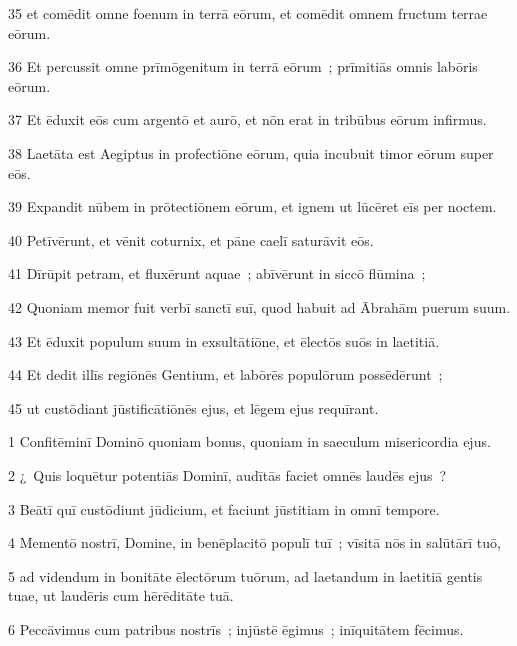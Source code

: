 \psalmVerse
  {\phantom{0}35}
  {et comēdit omne foenum in terrā eōrum, et comēdit omnem fructum terrae eōrum.}


\psalmVerse
  {\phantom{0}36}
  {Et percussit omne prīmōgenitum in terrā eōrum~; prīmitiās omnis labōris eōrum.}


\psalmVerse
  {\phantom{0}37}
  {Et ēduxit eōs cum argentō et aurō, et nōn erat in tribūbus eōrum infirmus.}


\psalmVerse
  {\phantom{0}38}
  {Laetāta est Aegiptus in profectiōne eōrum, quia incubuit timor eōrum super eōs.}


\psalmVerse
  {\phantom{0}39}
  {Expandit nūbem in prōtectiōnem eōrum, et ignem ut lūcēret eīs per noctem.}


\psalmVerse
  {\phantom{0}40}
  {Petīvērunt, et vēnit coturnix, et pāne caelī saturāvit eōs.}


\psalmVerse
  {\phantom{0}41}
  {Dīrūpit petram, et fluxērunt aquae~; abīvērunt in siccō flūmina~;}


\psalmVerse
  {\phantom{0}42}
  {Quoniam memor fuit verbī sanctī suī, quod habuit ad Ābrahām puerum suum.}


\psalmVerse
  {\phantom{0}43}
  {Et ēduxit populum suum in exsultātiōne, et ēlectōs suōs in laetitiā.}


\psalmVerse
  {\phantom{0}44}
  {Et dedit illīs regiōnēs Gentium, et labōrēs populōrum possēdērunt~;}


\psalmVerse
  {\phantom{0}45}
  {ut custōdiant jūstificātiōnēs ejus, et lēgem ejus requīrant.}




\psalmVerse
  {\phantom{00}1}
  {Confitēminī Dominō quoniam bonus, quoniam in saeculum misericordia ejus.}


\psalmVerse
  {\phantom{00}2}
  {¿~Quis loquētur potentiās Dominī, audītās faciet omnēs laudēs ejus~?}


\psalmVerse
  {\phantom{00}3}
  {Beātī quī custōdiunt jūdicium, et faciunt jūstitiam in omnī tempore.}


\psalmVerse
  {\phantom{00}4}
  {Mementō nostrī, Domine, in benēplacitō populī tuī~; vīsitā nōs in salūtārī tuō,}


\psalmVerse
  {\phantom{00}5}
  {ad videndum in bonitāte ēlectōrum tuōrum, ad laetandum in laetitiā gentis tuae, ut laudēris cum hērēditāte tuā.}


\psalmVerse
  {\phantom{00}6}
  {Peccāvimus cum patribus nostrīs~; injūstē ēgimus~; inīquitātem fēcimus.}


